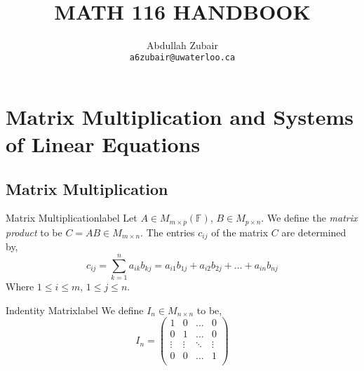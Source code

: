 \documentclass[12pt]{article}
\title{ \normalsize \textsc{}   %
      \\[2.0cm]               %
      \HRule{0.5pt} \\            %
      \LARGE \textbf{\uppercase{Math 116 Handbook}} %
      \HRule{2pt} \\ [0.5cm]    %
      \normalsize     %
    }
\author{
    Abdullah Zubair\\
        \texttt{a6zubair@uwaterloo.ca} \\
}
\theoremstyle{definition}
\newcommand{\F}{\ensuremath{\mathbb{F}}}
\begin{document}
\setcounter{section}{1}
\section{Matrix Multiplication and Systems of Linear Equations}
\subsection{Matrix Multiplication}

\begin{definition}{Matrix Multiplication}{label}
   Let $A \in M_{m \times p}(\F)$, $B \in M_{p \times n}$. We define the \emph{matrix product} to be $C = AB \in M_{m\times n}$. The entries $c_{ij}$ of the matrix $C$ are determined by,
   $$c_{ij} = \sum_{k = 1}^n a_{ik}b_{kj} = a_{i1}b_{1j} + a_{i2}b_{2j} + \dots + a_{in}b_{nj}$$
   Where $1 \leq i \leq m$, $1 \leq j \leq n$. 
\end{definition}
\begin{definition}{Indentity Matrix}{label}
    We define $I_n \in M_{n \times n}$ to be,
    $$ I_n = \begin{pmatrix}
       1 & 0 & \dots & 0 \\ 
       0 & 1 & \dots & 0 \\ 
       \vdots & \vdots & \ddots & \vdots \\ 
       0 & 0 & \dots & 1 \\ 
    \end{pmatrix}$$
\end{definition}
\end{document}
